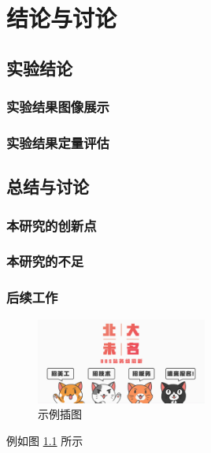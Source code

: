 
\chapter{结论与讨论}
\section{实验结论}
\subsection{实验结果图像展示}
\subsection{实验结果定量评估}
\section{总结与讨论}
\subsection{本研究的创新点}
\subsection{本研究的不足}
\subsection{后续工作}



\begin{figure}[htbp!]
    \centering
    \includegraphics[width = 0.5\textwidth,natwidth=610,natheight=642]{chap/index_MKoueo.jpg}
    \caption{示例插图}\label{fig:example}
\end{figure}

\par
例如图 \ref{fig:example} 所示

